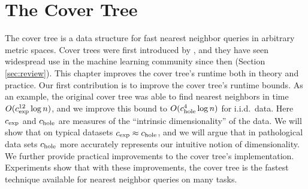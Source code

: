 \documentclass[thesis.tex]{subfiles}
\newcommand{\cexp}{c_\textnormal{exp}}
\newcommand{\chole}{c_\textnormal{hole}}
\begin{document}
\chapter{The Cover Tree}

\noindent
The cover tree is a data structure for fast nearest neighbor queries in arbitrary metric spaces.
Cover trees were first introduced by \cite{beygelzimer2006cover},
and they have seen widespread use in the machine learning community since then
(Section \ref{sec:review}).
This chapter improves the cover tree's runtime both in theory and practice.
Our first contribution is to improve the cover tree's runtime bounds.
As an example, 
the original cover tree was able to find nearest neighbors in time $O(\cexp^{12}\log n)$,
and we improve this bound to $O(\chole^4\log n)$ for i.i.d.\ data.
Here $\cexp$ and $\chole$ are measures of the ``intrinsic dimensionality'' of the data.
We will show that on typical datasets $\cexp \approx \chole$,
and we will argue that in pathological data sets $\chole$ more accurately represents our intuitive notion of dimensionality.
We further provide practical improvements to the cover tree's implementation.
Experiments show that with these improvements,
the cover tree is the fastest technique available for nearest neighbor queries on many tasks.

\end{document}
